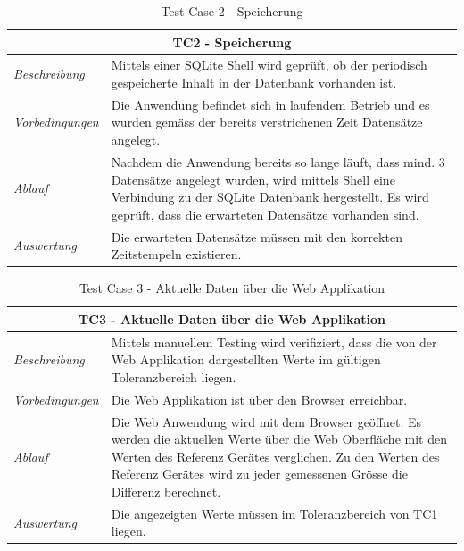 \documentclass[
    10pt,
    a4paper,
]{scrartcl}
\begin{document}
\begin{table}
    \centering
    \begin{tabularx}{\columnwidth}{lX}
        \multicolumn{2}{c}{\textbf{TC2 - Speicherung}} \\\toprule
        \textit{Beschreibung} & Mittels einer SQLite Shell wird geprüft, ob der periodisch
            gespeicherte Inhalt in der Datenbank vorhanden ist. \\\midrule
        \textit{Vorbedingungen} & Die Anwendung befindet sich in laufendem Betrieb und es
            wurden gemäss der bereits verstrichenen Zeit Datensätze angelegt.\\\midrule
        \textit{Ablauf} & Nachdem die Anwendung bereits so lange läuft, dass mind. 3
            Datensätze angelegt wurden, wird mittels Shell eine Verbindung zu der SQLite
            Datenbank hergestellt. Es wird geprüft, dass die erwarteten Datensätze vorhanden
            sind. \\\midrule
        \textit{Auswertung} & Die erwarteten Datensätze müssen mit den korrekten
            Zeitstempeln existieren. \\\bottomrule
    \end{tabularx}
    \caption{Test Case 2 - Speicherung}
    \label{tab:tc2}
\end{table}

\begin{table}
    \centering
    \begin{tabularx}{\columnwidth}{lX}
        \multicolumn{2}{c}{\textbf{TC3 - Aktuelle Daten über die Web Applikation}} \\\toprule
        \textit{Beschreibung} & Mittels manuellem Testing wird verifiziert, dass die von
            der Web Applikation dargestellten Werte im gültigen Toleranzbereich
            liegen.\\\midrule
        \textit{Vorbedingungen} & Die Web Applikation ist über den Browser erreichbar.
            \\\midrule
        \textit{Ablauf} & Die Web Anwendung wird mit dem Browser geöffnet. Es werden die
            aktuellen Werte über die Web Oberfläche mit den Werten des Referenz Gerätes
            verglichen. Zu den Werten des Referenz Gerätes wird zu jeder gemessenen Grösse die
            Differenz berechnet. \\\midrule
        \textit{Auswertung} & Die angezeigten Werte müssen im Toleranzbereich von TC1
            liegen. \\\bottomrule
    \end{tabularx}
    \caption{Test Case 3 - Aktuelle Daten über die Web Applikation}
    \label{tab:tc3}
\end{table}
\end{document}
